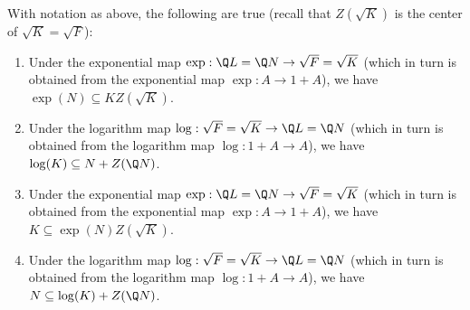\documentclass{ucetd}
\begin{document}
\begin{lemma}\label{lemma:exp-log-error-term}
  With notation as above, the following are true (recall that
  $Z(\sqrt{K})$ is the center of $\sqrt{K} = \sqrt{F}$):

  \begin{enumerate}
  \item Under the exponential map $\exp: \Q L = \Q N \to \sqrt{F} =
    \sqrt{K}$ (which in turn is obtained from the exponential map
    $\exp:A \to 1 + A$), we have $\exp(N) \subseteq
    KZ(\sqrt{K})$. 
  \item Under the logarithm map $\log: \sqrt{F} = \sqrt{K} \to \Q L =
    \Q N$ (which in turn is obtained from the logarithm map $\log:1 +
    A \to A$), we have $\log(K) \subseteq N + Z(\Q N)$.
  \item Under the exponential map $\exp: \Q L = \Q N \to \sqrt{F} =
    \sqrt{K}$ (which in turn is obtained from the exponential map
    $\exp:A \to 1 + A$), we have $K \subseteq
    \exp(N)Z(\sqrt{K})$. 
  \item Under the logarithm map $\log: \sqrt{F} = \sqrt{K} \to \Q L =
    \Q N$ (which in turn is obtained from the logarithm map $\log:1 +
    A \to A$), we have $N \subseteq \log(K) + Z(\Q N)$.

  \end{enumerate}
\end{lemma}
\end{document}
